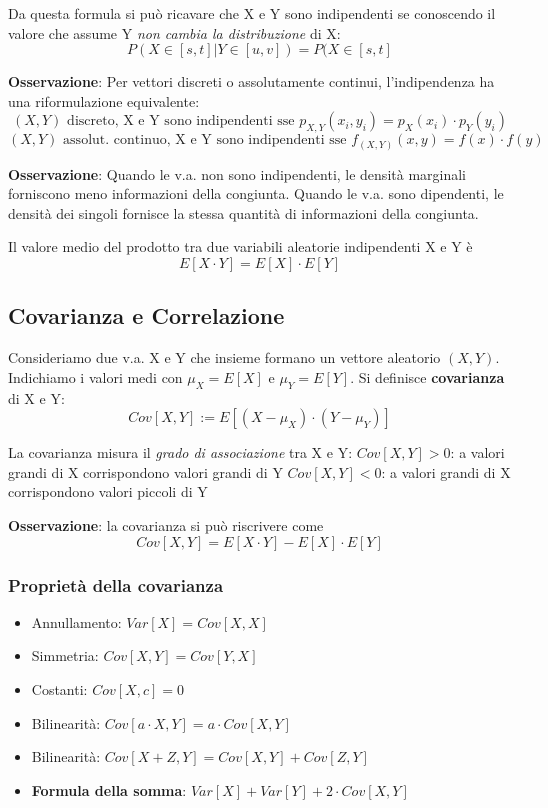 \noindent  Da questa formula si può ricavare che X e Y sono indipendenti se conoscendo il valore che assume Y \textit{non cambia la distribuzione} di X: $$P(X \in [s,t] | Y \in [u,v] ) = P(X \in [s,t]$$

\noindent \textbf{Osservazione}: Per vettori discreti o assolutamente continui, l'indipendenza ha una riformulazione equivalente: $$(X,Y) \text{ discreto, X e Y sono indipendenti sse } p_{X,Y}(x_i,y_i) = p_X(x_i) \cdot p_Y(y_i)$$ $$(X,Y) \text{ assolut. continuo, X e Y sono indipendenti sse } f_{(X,Y)}(x,y) = f(x) \cdot f(y)$$

\noindent \textbf{Osservazione}: Quando le v.a. non sono indipendenti, le densità marginali forniscono meno informazioni della congiunta. Quando le v.a. sono dipendenti, le densità dei singoli fornisce la stessa quantità di informazioni della congiunta. \newline

\noindent Il valore medio del prodotto tra due variabili aleatorie indipendenti X e Y è $$E[X \cdot Y] = E[X] \cdot E[Y]$$

\subsection{Covarianza e Correlazione}

Consideriamo due v.a. X e Y che insieme formano un vettore aleatorio $(X,Y)$. Indichiamo i valori medi con $\mu_X = E[X]$ e $\mu_Y = E[Y]$. \newline Si definisce \textbf{covarianza} di X e Y: $$Cov[X,Y] := E[(X - \mu_X) \cdot (Y - \mu_Y)]$$

\noindent La covarianza misura il \textit{grado di associazione} tra X e Y: \newline $Cov[X,Y] > 0$: a valori grandi di X corrispondono valori grandi di Y \newline  $Cov[X,Y] < 0$: a valori grandi di X corrispondono valori piccoli di Y \newline

\noindent \textbf{Osservazione}: la covarianza si può riscrivere come $$Cov[X,Y] = E[X \cdot Y] - E[X] \cdot E[Y]$$

\subsubsection{Proprietà della covarianza}

\begin{itemize}
    \item Annullamento: $Var[X] = Cov[X, X]$
    \item Simmetria: $Cov[X,Y]= Cov[Y,X]$
    \item Costanti: $Cov[X, c] = 0$
    \item Bilinearità: $Cov[a \cdot X, Y] = a\cdot Cov[X, Y]$ 
    \item Bilinearità: $Cov[X + Z, Y] = Cov[X, Y] + Cov[Z, Y]$
    \item \textbf{Formula della somma}: $Var[X] + Var[Y] + 2 \cdot Cov[X,Y]$
\end{itemize}


